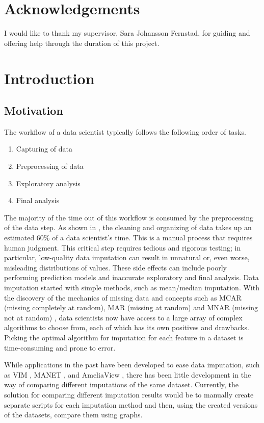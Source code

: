 \documentclass[a4paper, 11pt]{article}
\begin{document}
\section*{Acknowledgements}
I would like to thank my supervisor, Sara Johansson Fernstad, for guiding and
offering help through the duration of this project.
\newpage


\tableofcontents
\newpage

\section{Introduction}
\subsection{Motivation}
The workflow of a data scientist typically follows the following order of
tasks. 
\begin{enumerate}
        \item Capturing of data
        \item Preprocessing of data 
        \item Exploratory analysis 
        \item Final analysis 
\end{enumerate}

The majority of the time out of this workflow is consumed by the preprocessing of
the data step. As shown in \cite[p~3 fig~2]{sarih_data_2019}, the cleaning and
organizing of data takes up an estimated 60\% of a data scientist's time. This
is a manual process that requires human judgment. This critical step requires
tedious and rigorous testing; in particular, low-quality data imputation can
result in unnatural or, even worse, misleading distributions of values. These
side effects can include poorly performing prediction models and inaccurate
exploratory and final analysis. Data imputation started with simple methods,
such as mean/median imputation. With the discovery of the mechanics of missing
data and concepts such as MCAR (missing completely at random), MAR (missing at
random) and MNAR (missing not at random) \cite{little_statistical_2019}, data
scientists now have access to a large array of complex algorithms to choose
from, each of which has its own positives and drawbacks. Picking the optimal
algorithm for imputation for each feature in a dataset is time-consuming and
prone to error. 

While applications in the past have been developed to ease data imputation,
such as VIM \cite{templ_exploring_2012}, MANET \cite{unwin_interactive_1996},
and AmeliaView \cite{honaker_amelia_2024}, there has been little development in
the way of comparing different imputations of the same dataset. Currently, the
solution for comparing different imputation results would be to manually create
separate scripts for each imputation method and then, using the created
versions of the datasets, compare them using graphs. 
\end{document}
